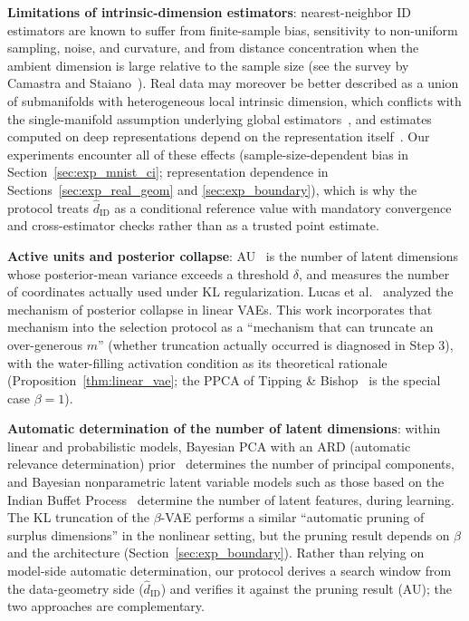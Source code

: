 \documentclass[make,article,submit,pdftex,moreauthors]{Definitions/mdpi}
\newcommand{\hatdID}{\hat{d}_{\mathrm{ID}}}
\begin{document}
\textbf{Limitations of intrinsic-dimension estimators}:
nearest-neighbor ID estimators are known to suffer from finite-sample bias,
sensitivity to non-uniform sampling, noise, and curvature, and from
distance concentration when the ambient dimension is large relative to the
sample size (see the survey by Camastra and
Staiano~\cite{camastra2016intrinsic}).
Real data may moreover be better described as a union of submanifolds with
heterogeneous local intrinsic dimension, which conflicts with the
single-manifold assumption underlying global
estimators~\cite{allegra2020data}, and estimates computed on deep
representations depend on the representation
itself~\cite{ansuini2019intrinsic,pope2021intrinsic}.
Our experiments encounter all of these effects (sample-size-dependent bias
in Section~\ref{sec:exp_mnist_ci}; representation dependence in
Sections~\ref{sec:exp_real_geom} and \ref{sec:exp_boundary}), which is why
the protocol treats $\hatdID$ as a conditional reference value with
mandatory convergence and cross-estimator checks rather than as a trusted
point estimate.

\textbf{Active units and posterior collapse}:
AU~\cite{higgins2017betavae,lucas2019elbo} is the number of latent
dimensions whose posterior-mean variance exceeds a threshold $\delta$, and
measures the number of coordinates actually used under KL regularization.
Lucas et al.~\cite{lucas2019elbo} analyzed the mechanism of posterior
collapse in linear VAEs.
This work incorporates that mechanism into the selection protocol as a
``mechanism that can truncate an over-generous $m$'' (whether truncation
actually occurred is diagnosed in Step 3), with the water-filling activation
condition as its theoretical rationale
(Proposition~\ref{thm:linear_vae}; the PPCA of Tipping \&
Bishop~\cite{tippingbishop1999ppca} is the special case $\beta = 1$).

\textbf{Automatic determination of the number of latent dimensions}:
within linear and probabilistic models, Bayesian PCA with an ARD (automatic
relevance determination) prior~\cite{bishop1999bayesian} determines the
number of principal components, and Bayesian nonparametric latent variable
models such as those based on the Indian Buffet
Process~\cite{ghahramani2005infinite} determine the number of latent
features, during learning.
The KL truncation of the $\beta$-VAE performs a similar ``automatic pruning
of surplus dimensions'' in the nonlinear setting, but the pruning result
depends on $\beta$ and the architecture (Section~\ref{sec:exp_boundary}).
Rather than relying on model-side automatic determination, our protocol
derives a search window from the data-geometry side ($\hatdID$) and
verifies it against the pruning result (AU); the two approaches are
complementary.
\end{document}
